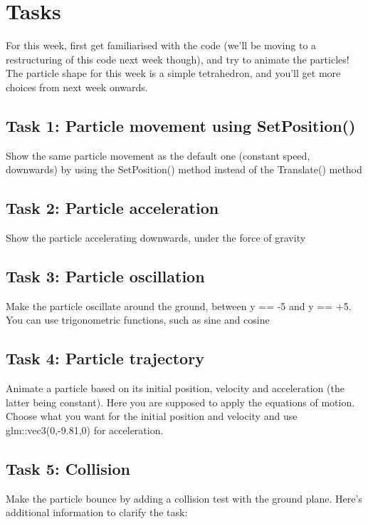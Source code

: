 \documentclass[12pt]{article}
\begin{document}
\section*{Tasks}

For this week, first get familiarised with the code (we'll be moving to a restructuring of this code next week though), and try to animate the particles! The particle shape for this week is a simple tetrahedron, and you'll get more choices from next week onwards. 

\subsection*{Task 1: Particle movement using SetPosition()}

Show the same particle movement as the default one (constant speed, downwards) by using the SetPosition() method instead of the Translate() method

\subsection*{Task 2: Particle acceleration}

Show the particle accelerating downwards, under the force of gravity

\subsection*{Task 3: Particle oscillation}

Make the particle oscillate around the ground, between y == -5 and y == +5. You can use trigonometric functions, such as sine and cosine

\subsection*{Task 4: Particle trajectory}

Animate a particle based on its initial position, velocity and acceleration (the latter being constant). Here you are supposed to apply the equations of motion. Choose what you want for the initial position and velocity and use glm::vec3(0,-9.81,0) for acceleration.

\subsection*{Task 5: Collision}

Make the particle bounce by adding a collision test with the ground plane. Here's additional information to clarify the task:
\end{document}

